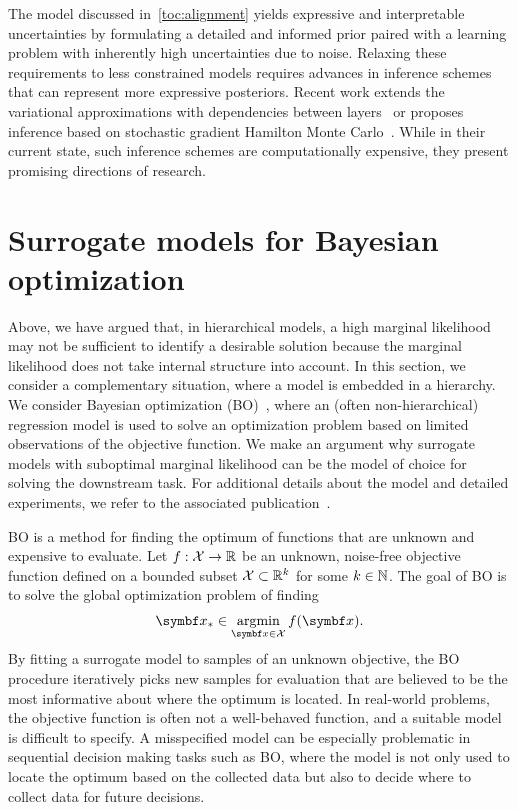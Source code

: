 The model discussed in~\cref{toc:alignment} yields expressive and interpretable uncertainties by formulating a detailed and informed prior paired with a learning problem with inherently high uncertainties due to noise.
Relaxing these requirements to less constrained models requires advances in inference schemes that can represent more expressive posteriors.
Recent work extends the variational approximations with dependencies between layers~\parencite{ustyuzhaninov_compositional_2020} or proposes inference based on stochastic gradient Hamilton Monte Carlo~\parencite{havasi_inference_2018,duane_hybrid_1987}.
While in their current state, such inference schemes are computationally expensive, they present promising directions of research.

\section{Surrogate models for Bayesian optimization}
\label{toc:discussion:bo}
Above, we have argued that, in hierarchical models, a high marginal likelihood may not be sufficient to identify a desirable solution because the marginal likelihood does not take internal structure into account.
In this section, we consider a complementary situation, where a model is embedded in a hierarchy.
We consider Bayesian optimization (BO)~\parencite{snoek_practical_2012}, where an (often non-hierarchical) regression model is used to solve an optimization problem based on limited observations of the objective function.
We make an argument why surrogate models with suboptimal marginal likelihood can be the model of choice for solving the downstream task.
For additional details about the model and detailed experiments, we refer to the associated publication~\parencite{bodin_modulating_2020}.

BO is a method for finding the optimum of functions that are unknown and expensive to evaluate.
Let $f : \mathcal{X} \to \mathbb{R}$ be an unknown, noise-free objective function defined on a bounded subset $\mathcal{X} \subset \mathbb{R}^k$ for some $k \in \mathbb{N}$.
The goal of BO is to solve the global optimization problem of finding
\begin{align}
    \mat{x}_\ast \in \argmin_{\mat{x} \in \Xc} f(\mat{x}).
\end{align}
By fitting a surrogate model to samples of an unknown objective, the BO procedure iteratively picks new samples for evaluation that are believed to be the most informative about where the optimum is located.
In real-world problems, the objective function is often not a well-behaved function, and a suitable model is difficult to specify.
A misspecified model can be especially problematic in sequential decision making tasks such as BO, where the model is not only used to locate the optimum based on the collected data but also to decide where to collect data for future decisions.

